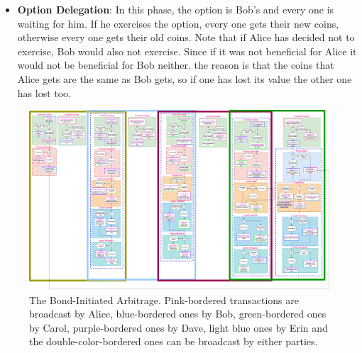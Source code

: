 \begin{itemize}
    \item \textbf{Option Delegation}: In this phase, the option is Bob's and every one is waiting for him. If he exercises the option, every one gets their new coins, otherwise every one gets their old coins. Note  that  if  Alice  has  decided  not  to exercise, Bob would also not exercise. Since if  it was not beneficial for Alice it  would not be beneficial for Bob neither. the reason is that the coins that Alice gets are the same as Bob gets, so if one has lost its value the other one has lost too.
\end{itemize}

\begin{figure}[!ht]
    \centering
    \includegraphics[width=\textwidth]{figures/bond-initiated-arbitrage.png}
    \caption{The Bond-Initiated Arbitrage. Pink-bordered transactions are broadcast by Alice, blue-bordered ones by Bob, green-bordered ones by Carol, purple-bordered ones by Dave, light blue ones by Erin and the double-color-bordered ones can be broadcast by either parties.}
    \label{fig:bond-arbitrage}
\end{figure}